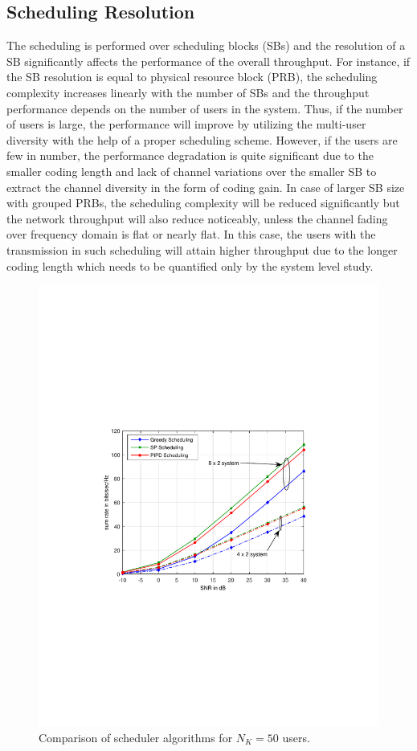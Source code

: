\documentclass[conference,letterpaper,10pt]{./../../IEEE/IEEEtran}
\begin{document}
\subsection{Scheduling Resolution}
The scheduling is performed over scheduling blocks (SBs) and the resolution of a SB significantly affects the performance of the overall throughput. For instance, if the SB resolution is equal to physical resource block (PRB), the scheduling complexity increases linearly with the number of SBs and the throughput performance depends on the number of users in the system. Thus, if the number of users is large, the performance will improve by utilizing the multi-user diversity with the help of a proper scheduling scheme. However, if the users are few in number, the performance degradation is quite significant due to the smaller coding length and lack of channel variations over the smaller SB to extract the channel diversity in the form of coding gain. In case of larger SB size with grouped PRBs, the scheduling complexity will be reduced significantly but the network throughput will also reduce noticeably, unless the channel fading over frequency domain is flat or nearly flat. In this case, the users with the transmission in such scheduling will attain higher throughput due to the longer coding length which needs to be quantified only by the system level study.
\begin{figure}
\centering
\includegraphics[trim=1.5in 3.5in 1.5in 3.5in,width=\columnwidth]{sra_50_users}
\caption{Comparison of scheduler algorithms for $N_K = 50$ users.}
\label{kuva:performance_plot}
 \vspace{-0.15in}
\end{figure}
\end{document}
